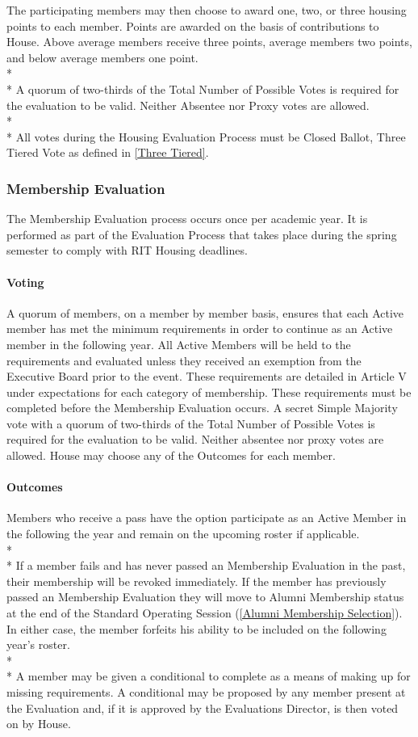 \documentclass{article}
\newcommand{\bsubsection}[1]{\subsubsection{#1} \label{#1}}
\newcommand{\bsubsubsection}[1]{\paragraph{#1} \label{#1}}
\begin{document}
The participating members may then choose to award one, two, or three housing points to each member.
Points are awarded on the basis of contributions to House.
Above average members receive three points, average members two points, and below average members one point.
\\* \\*
A quorum of two-thirds of the Total Number of Possible Votes is required for the evaluation to be valid.
Neither Absentee nor Proxy votes are allowed.
\\* \\*
All votes during the Housing Evaluation Process must be Closed Ballot, Three Tiered Vote as defined in \ref{Three Tiered}.
\bsubsection{Membership Evaluation}
The Membership Evaluation process occurs once per academic year. It is performed as part of the Evaluation Process that takes place during the spring semester to comply with RIT Housing deadlines.
\bsubsubsection{Voting} 
A quorum of members, on a member by member basis, ensures that each Active member has met the minimum requirements in order to continue as an Active member in the following year.
All Active Members will be held to the requirements and evaluated unless they received an exemption from the Executive Board prior to the event.
These requirements are detailed in Article V under expectations for each category of membership.
These requirements must be completed before the Membership Evaluation occurs.
A secret Simple Majority vote with a quorum of two-thirds of the Total Number of Possible Votes is required for the evaluation to be valid.
Neither absentee nor proxy votes are allowed.
House may choose any of the Outcomes for each member.
\bsubsubsection{Outcomes}
Members who receive a pass have the option participate as an Active Member in the following the year and remain on the upcoming roster if applicable.
\\* \\*
If a member fails and has never passed an Membership Evaluation in the past, their membership will be revoked immediately.
If the member has previously passed an Membership Evaluation they will move to Alumni Membership status at the end of the Standard Operating Session (\ref{Alumni Membership Selection}).
In either case, the member forfeits his ability to be included on the following year’s roster.
\\* \\*
A member may be given a conditional to complete as a means of making up for missing requirements.
A conditional may be proposed by any member present at the Evaluation and, if it is approved by the Evaluations Director, is then voted on by House.
\end{document}
